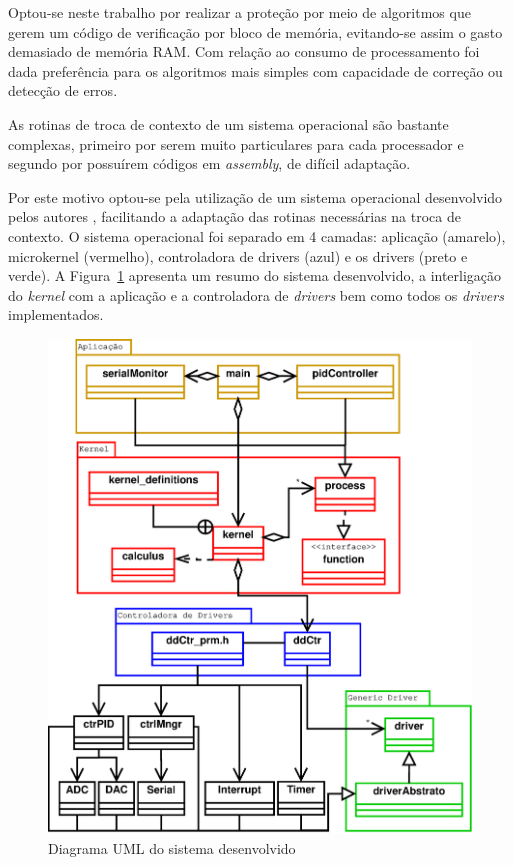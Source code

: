 \documentclass[12pt,openright,oneside,a4paper,brazil]{abntex2}
\begin{document}
Optou-se neste trabalho por realizar a proteção por meio de algoritmos que gerem um código de verificação por bloco de memória, evitando-se assim o gasto demasiado de memória RAM. Com relação ao consumo de processamento foi dada preferência para os algoritmos mais simples com capacidade de correção ou detecção de erros.

As rotinas de troca de contexto de um sistema operacional são bastante complexas, primeiro por serem muito particulares para cada processador e segundo por possuírem códigos em \textit{assembly}, de difícil adaptação.

Por este motivo optou-se pela utilização de um sistema operacional desenvolvido pelos autores \cite{de2013microkernel}, facilitando a adaptação das rotinas necessárias na troca de contexto. O sistema operacional foi separado em 4 camadas: aplicação (amarelo), microkernel (vermelho), controladora de drivers (azul) e os drivers (preto e verde). A Figura~\ref{fig:diagramaClasse} apresenta um resumo do sistema desenvolvido, a interligação do \textit{kernel} com a aplicação e a controladora de \textit{drivers} bem como todos os \textit{drivers} implementados.

\begin{figure}[htbp]
	\begin{center}
	\includegraphics[width=13cm]{uml/umlCompleto.eps}
	\caption{Diagrama UML do sistema desenvolvido}
	\label{fig:diagramaClasse}
	\end{center}
\end{figure}
\end{document}
